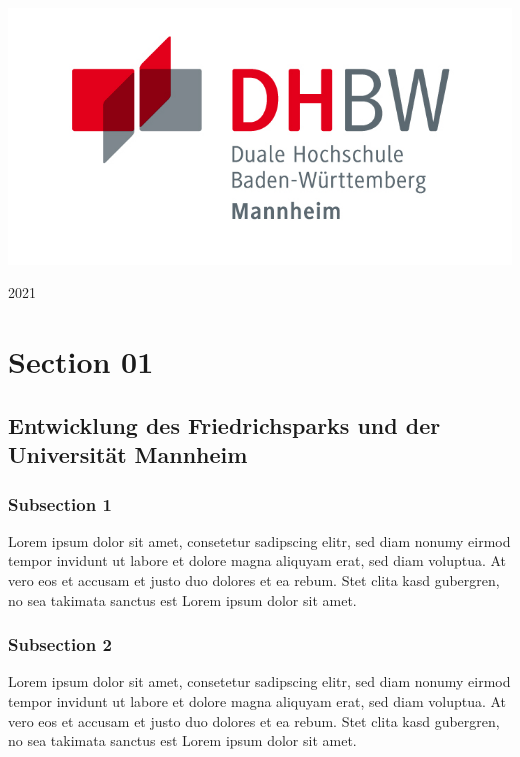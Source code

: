\documentclass[a4paper, 11pt, oneside]{book} %
\begin{document}
\begin{titlepage}
    \includegraphics{assets/DHBW_MA_Logo.jpg}
	
	\vspace{0.3\baselineskip} 
	
	2021 

\end{titlepage}


\tableofcontents
\newpage

\chapter{Section 01}

\section{Entwicklung des Friedrichsparks und der Universität Mannheim} 
\subsection{Subsection 1}
Lorem ipsum dolor sit amet, consetetur sadipscing elitr, sed diam nonumy eirmod tempor invidunt ut labore et dolore magna aliquyam erat, sed diam voluptua. At vero eos et accusam et justo duo dolores et ea rebum. Stet clita kasd gubergren, no sea takimata sanctus est Lorem ipsum dolor sit amet.
\subsection{Subsection 2}
Lorem ipsum dolor sit amet, consetetur sadipscing elitr, sed diam nonumy eirmod tempor invidunt ut labore et dolore magna aliquyam erat, sed diam voluptua. At vero eos et accusam et justo duo dolores et ea rebum. Stet clita kasd gubergren, no sea takimata sanctus est Lorem ipsum dolor sit amet.
\end{document}
